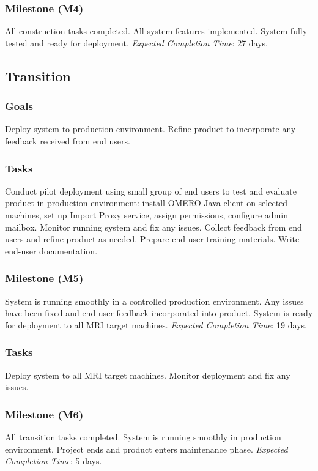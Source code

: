 \subsubsection*{Milestone (M4)}
All construction tasks completed. All system features implemented. System fully tested
and ready for deployment.
\emph{Expected Completion Time}: 27 days. %

\subsection{Transition}

\subsubsection*{Goals}
Deploy system to production environment. Refine product to incorporate any feedback
received from end users.

\subsubsection*{Tasks} 
Conduct pilot deployment using small group of end users to test and evaluate product
in production environment: install OMERO Java client on selected machines, set up 
Import Proxy service, assign permissions, configure admin mailbox.
Monitor running system and fix any issues.
Collect feedback from end users and refine product as needed.
Prepare end-user training materials.
Write end-user documentation. 

\subsubsection*{Milestone (M5)}
System is running smoothly in a controlled production environment. Any issues have 
been fixed and end-user feedback incorporated into product. System is ready for 
deployment to all MRI target machines.
\emph{Expected Completion Time}: 19 days. %

\subsubsection*{Tasks}
Deploy system to all MRI target machines.
Monitor deployment and fix any issues.

\subsubsection*{Milestone (M6)}
All transition tasks completed. System is running smoothly in production environment. 
Project ends and product enters maintenance phase.
\emph{Expected Completion Time}: 5 days. %


